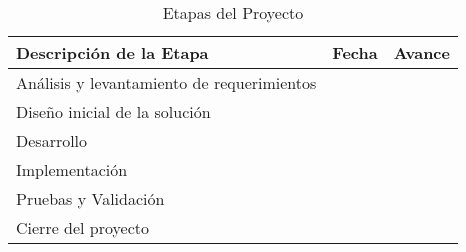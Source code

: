 \begin{table}[H]
	\centering
	\begin{tabular}{@{}lll@{}}
		\toprule
		\textbf{Descripción de la Etapa}           & \textbf{Fecha} & \textbf{Avance} \\ \midrule
		Análisis y levantamiento de requerimientos &                &                 \\
		Diseño inicial de la solución              &                &                 \\
		Desarrollo                                 &                &                 \\
		Implementación                             &                &                 \\
		Pruebas y Validación                       &                &                 \\
		Cierre del proyecto                        &                &                 \\ \bottomrule
	\end{tabular}
	\caption{Etapas del Proyecto}
	\label{tab:etapas}
\end{table}
